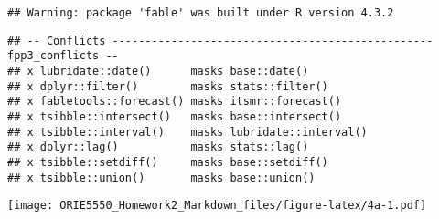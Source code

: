 \documentclass[
]{article}
\newenvironment{Shaded}{\begin{snugshade}}{\end{snugshade}}
\newcommand{\AttributeTok}[1]{\textcolor[rgb]{0.13,0.29,0.53}{#1}}
\newcommand{\DecValTok}[1]{\textcolor[rgb]{0.00,0.00,0.81}{#1}}
\newcommand{\FunctionTok}[1]{\textcolor[rgb]{0.13,0.29,0.53}{\textbf{#1}}}
\newcommand{\NormalTok}[1]{#1}
\newcommand{\OtherTok}[1]{\textcolor[rgb]{0.56,0.35,0.01}{#1}}
\newcommand{\SpecialCharTok}[1]{\textcolor[rgb]{0.81,0.36,0.00}{\textbf{#1}}}
\newcommand{\StringTok}[1]{\textcolor[rgb]{0.31,0.60,0.02}{#1}}
\begin{document}
\begin{verbatim}
## Warning: package 'fable' was built under R version 4.3.2
\end{verbatim}

\begin{verbatim}
## -- Conflicts ------------------------------------------------- fpp3_conflicts --
## x lubridate::date()      masks base::date()
## x dplyr::filter()        masks stats::filter()
## x fabletools::forecast() masks itsmr::forecast()
## x tsibble::intersect()   masks base::intersect()
## x tsibble::interval()    masks lubridate::interval()
## x dplyr::lag()           masks stats::lag()
## x tsibble::setdiff()     masks base::setdiff()
## x tsibble::union()       masks base::union()
\end{verbatim}

\begin{Shaded}
\end{Shaded}

\texttt{[image: ORIE5550\_Homework2\_Markdown\_files/figure-latex/4a-1.pdf]}
\end{document}
